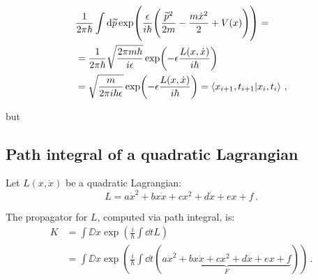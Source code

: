 \documentclass[main.tex]{subfiles}
\begin{document}
%
\begin{subequations}
\begin{align}
  &\frac{1}{2 \pi \hbar} \int  \dd{\widetilde{p}} 
  \exp(\frac{\epsilon}{i \hbar} \qty(\frac{\widetilde{p}^2 }{2m} - \frac{m \dot{x}^2}{2} + V(x))) =  \\
  &= \frac{1}{2 \pi \hbar} \sqrt{\frac{2 \pi m \hbar }{i \epsilon }} \exp(- \epsilon  \frac{L(x, \dot{x})}{i \hbar}) \\
  &=  \sqrt{\frac{ m  }{2 \pi i \hbar \epsilon }} \exp(- \epsilon  \frac{L(x, \dot{x})}{i \hbar}) = \braket{x_{i+1}, t_{i+1}}{x_{i}, t_{i}}
  \,,
\end{align}
\end{subequations}

but 

\subsection{Path integral of a quadratic Lagrangian}

Let \(L(x,\dot{x})\) be a quadratic Lagrangian:
\begin{equation}
  L = a\dot{x}^2 + bx\dot{x} + cx^2 + d\dot{x} + ex + f
  \,.
\end{equation}

The propagator for $L$, computed via path integral, is:
%
\begin{subequations}
  \begin{align}
    K &= \int\DD{x} \exp(\frac{i}{\hbar}\int \dd{t} L) \\
    &= \int\DD{x} \exp(\frac{i}{\hbar}\int \dd{t} ( \underbrace{a\dot{x}^2 + bx\dot{x} + cx^2 + d\dot{x} + ex + f}_F) )
    \,.
  \end{align}
\end{subequations}
\end{document}
